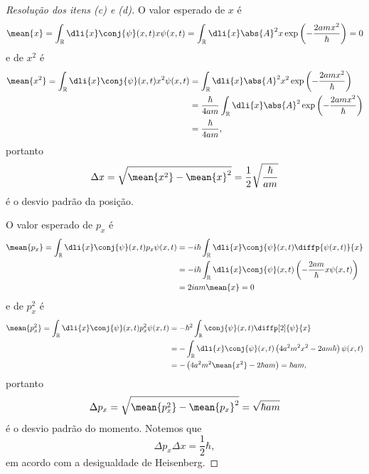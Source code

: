 \begin{proof}[Resolução dos itens (c) e (d)]
    O valor esperado de \(x\) é
    \begin{equation}
        \mean{x} = \int_{\mathbb{R}}\dli{x}\conj{\psi}(x,t) x\psi(x,t) = \int_{\mathbb{R}} \dli{x} \abs{A}^2 x \exp\left(-\frac{2amx^2}{\hbar}\right) = 0
    \end{equation}
    e de \(x^2\) é
    \begin{align*}
        \mean{x^2} = \int_{\mathbb{R}}\dli{x}\conj{\psi}(x,t) x^2\psi(x,t)
        &= \int_{\mathbb{R}} \dli{x} \abs{A}^2x^2 \exp\left(-\frac{2amx^2}{\hbar}\right)\\
        &= \frac{\hbar}{4a m}\int_{\mathbb{R}} \dli{x} \abs{A}^2 \exp\left(-\frac{2amx^2}{\hbar}\right)\\
        &= \frac{\hbar}{4am},
    \end{align*}
    portanto
    \begin{equation*}
        \Delta x = \sqrt{\mean{x^2} - \mean{x}^2} = \frac12\sqrt{\frac{\hbar}{am}}
    \end{equation*}
    é o desvio padrão da posição.

    O valor esperado de \(p_x\) é
    \begin{align*}
        \mean{p_x} = \int_{\mathbb{R}}\dli{x}\conj{\psi}(x,t) p_x \psi(x,t)
        &= -i\hbar \int_{\mathbb{R}} \dli{x} \conj{\psi}(x,t) \diffp{\psi(x,t)}{x}\\
        &= -i\hbar \int_{\mathbb{R}} \dli{x} \conj{\psi}(x,t) \left(-\frac{2am}{\hbar}x\psi(x,t)\right)\\
        &= 2iam \mean{x} = 0
    \end{align*}
    e de \(p_x^2\) é
    \begin{align*}
        \mean{p_x^2} = \int_{\mathbb{R}} \dli{x} \conj{\psi}(x,t)p_x^2\psi(x,t)
        &= -\hbar^2\int_{\mathbb{R}} \conj{\psi}(x,t)\diffp[2]{\psi}{x}\\
        &= -\int_{\mathbb{R}} \dli{x} \conj{\psi}(x,t)\left(4a^2 m^2x^2 - 2am\hbar\right)\psi(x,t)\\
        &= -\left(4a^2 m^2 \mean{x^2} - 2\hbar am\right) = \hbar am,
    \end{align*}
    portanto
    \begin{equation*}
        \Delta p_x = \sqrt{\mean{p_x^2}- \mean{p_x}^2} = \sqrt{\hbar am}
    \end{equation*}
    é o desvio padrão do momento. Notemos que
    \begin{equation*}
        \Delta p_x \Delta x = \frac12 \hbar,
    \end{equation*}
    em acordo com a desigualdade de Heisenberg.
\end{proof}
